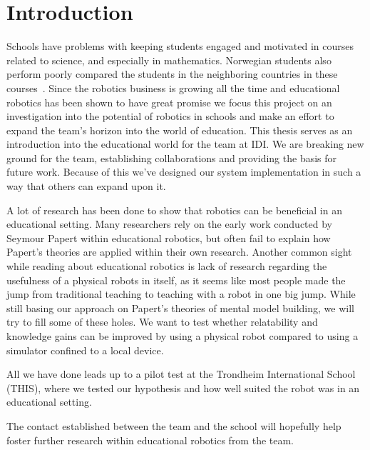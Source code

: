 \chapter{Introduction}
Schools have problems with keeping students engaged and motivated in courses related to science, and especially in mathematics. 
Norwegian students also perform poorly compared the students in the neighboring countries in these courses~\cite{OECDPISA}.
Since the robotics business is growing all the time and educational robotics has been shown to have great promise we focus this project on an investigation into the potential of robotics in schools and make an effort to expand the \chirp team's horizon into the world of education. This thesis serves as an introduction into the educational world for the \chirp team at IDI. We are breaking new ground for the team, establishing collaborations and providing the basis for future work. 
Because of this we've designed our system implementation in such a way that others can expand upon it. 

\bigskip\noindent
A lot of research has been done to show that robotics can be beneficial in an educational setting.
Many researchers rely on the early work conducted by Seymour Papert within educational robotics, but often fail to explain how Papert's theories are applied within their own research. 
Another common sight while reading about educational robotics is lack of research regarding the usefulness of a physical robots in itself, as it seems like most people made the jump from traditional teaching to teaching with a robot in one big jump. 
While still basing our approach on Papert's theories of mental model building, we will try to fill some of these holes. We want to test whether relatability and knowledge gains can be improved by using a physical robot compared to using a simulator confined to a local device. 


\bigskip\noindent
All we have done leads up to a pilot test at the Trondheim International School (THIS), where we tested our hypothesis and how well suited the \chirp robot was in an educational setting. 

\bigskip\noindent
The contact established between the \chirp team and the school will hopefully help foster further research within educational robotics from the \chirp team.





